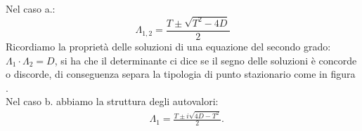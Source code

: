Nel caso a.:
\[
    \Lambda_{1, 2} = \frac{T \pm \sqrt{T^2 - 4D}}{2} 
\] 
Ricordiamo la proprietà delle soluzioni di una equazione del secondo grado: $\Lambda_1\cdot \Lambda_2 = D$, si ha che il determinante ci dice se il segno delle soluzioni è concorde o discorde, di conseguenza separa la tipologia di punto stazionario come in figura .\\
Nel caso b. abbiamo la struttura degli autovalori:
\[\begin{aligned}
    & \Lambda_1 = \frac{T\pm i\sqrt{4D-T^2}}{2}
.\end{aligned}\]
